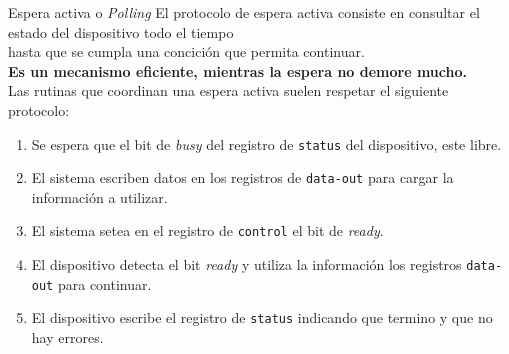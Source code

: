 \documentclass[aspectratio=169]{beamer}
\begin{document}
\begin{frame}{Espera activa o \emph{Polling}}
    \small
    El protocolo de espera activa consiste en consultar el estado del dispositivo todo el tiempo\\ hasta que se cumpla una concición que permita continuar.\\
    \medskip
    \textcolor{verdeuca}{\textbf{Es un mecanismo eficiente, mientras la espera no demore mucho.}}\\
    \bigskip
    Las rutinas que coordinan una espera activa suelen respetar el siguiente protocolo:\\
    \medskip
    \begin{enumerate}
    \item Se espera que el bit de \emph{busy} del registro de \texttt{status} del dispositivo, este libre.
    \item El sistema escriben datos en los registros de \texttt{data-out} para cargar la información a utilizar.
    \item El sistema setea en el registro de \texttt{control} el bit de \emph{ready}.
    \item El dispositivo detecta el bit \emph{ready} y utiliza la información los registros \texttt{data-out} para continuar.
    \item El dispositivo escribe el registro de \texttt{status} indicando que termino y que no hay errores.
    \end{enumerate}
\end{frame}
\end{document}
